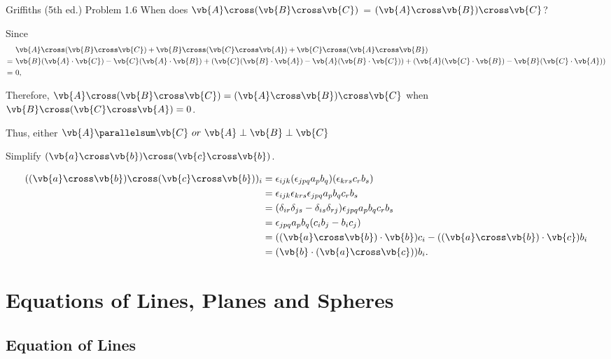 \documentclass[a4paper,12pt]{report}
\begin{document}
\example
{Griffiths (5th ed.) Problem 1.6}
{When does \(\vb{A} \cross (\vb{B} \cross \vb{C})\) = \((\vb{A} \cross \vb{B}) \cross \vb{C}\)?}
{Since
\begin{equation}
	\begin{aligned}
		&\vb{A} \cross (\vb{B} \cross \vb{C}) + \vb{B} \cross (\vb{C} \cross \vb{A}) + \vb{C} \cross (\vb{A} \cross \vb{B}) \\
		= ~&\vb{B}(\vb{A} \cdot \vb{C}) - \vb{C}(\vb{A} \cdot \vb{B}) + (\vb{C}(\vb{B} \cdot \vb{A}) - \vb{A}(\vb{B} \cdot \vb{C})) + (\vb{A}(\vb{C} \cdot \vb{B}) - \vb{B}(\vb{C} \cdot \vb{A})) \\
		= ~&0,
	\end{aligned}
\end{equation}

Therefore, \(\vb{A} \cross (\vb{B} \cross \vb{C}) = (\vb{A} \cross \vb{B}) \cross \vb{C}\) when \(\vb{B} \cross (\vb{C} \cross \vb{A}) = 0\).

Thus, either \(\vb{A} \parallelsum \vb{C} ~ or ~ \vb{A} \perp \vb{B} \perp \vb{C}\)}

{Simplify \((\vb{a} \cross \vb{b} )\cross (\vb{c} \cross \vb{b} )\). }
{\begin{equation}
    \begin{aligned}
        ((\vb{a} \cross \vb{b} )\cross (\vb{c} \cross \vb{b} ))_{i}  &= \epsilon _{ijk} (\epsilon _{jpq} a_{p} b_{q} )(\epsilon _{krs} c_{r} b_{s} ) \\
        &= \epsilon _{ijk} \epsilon _{krs} \epsilon _{jpq} a_{p} b_{q} c_{r} b_{s} \\
        &= (\delta _{ir} \delta _{js} -\delta _{is} \delta _{rj} ) \epsilon _{jpq} a_{p} b_{q} c_{r} b_{s} \\
        &= \epsilon _{jpq} a_{p} b_{q} (c_{i} b_{j} -b_{i} c_{j} ) \\
        &= ((\vb{a} \cross \vb{b} )\cdot \vb{b} )c_{i} - ((\vb{a} \cross \vb{b} )\cdot \vb{c} )b_{i} \\
        &= (\vb{b} \cdot (\vb{a} \cross \vb{c} ))b_{i}.  
    \end{aligned}
\end{equation}

} 


\section{Equations of Lines, Planes and Spheres}

\subsection{Equation of Lines}
\end{document}
